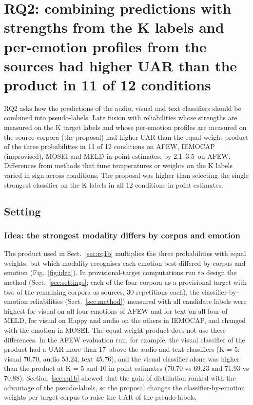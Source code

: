 \section{RQ2: combining predictions with strengths from the K labels and per-emotion profiles from the sources had higher UAR than the product in 11 of 12 conditions}\label{sec:rq2}

RQ2 asks how the predictions of the audio, visual and text classifiers should be combined into pseudo-labels. Late fusion with reliabilities whose strengths are measured on the K target labels and whose per-emotion profiles are measured on the source corpora (the proposal) had higher UAR than the equal-weight product of the three probabilities in 11 of 12 conditions on AFEW, IEMOCAP (improvised), MOSEI and MELD in point estimates, by 2.1--3.5\pt\ on AFEW. Differences from methods that tune temperatures or weights on the K labels varied in sign across conditions. The proposal was higher than selecting the single strongest classifier on the K labels in all 12 conditions in point estimates.

\subsection{Setting}

\subsubsection{Idea: the strongest modality differs by corpus and emotion}\label{sec:idea}
The product used in Sect.~\ref{sec:rq1b} multiplies the three probabilities with equal weights, but which modality recognises each emotion best differed by corpus and emotion (Fig.~\ref{fig:idea}). In provisional-target computations run to design the method (Sect.~\ref{sec:settings}; each of the four corpora as a provisional target with two of the remaining corpora as sources, 30 repetitions each), the classifier-by-emotion reliabilities (Sect.~\ref{sec:method}) measured with all candidate labels were highest for visual on all four emotions of AFEW and for text on all four of MELD, for visual on Happy and audio on the others in IEMOCAP, and changed with the emotion in MOSEI. The equal-weight product does not use these differences. In the AFEW evaluation run, for example, the visual classifier of the product had a UAR more than 17\pt\ above the audio and text classifiers (K = 5: visual 70.70, audio 53.24, text 45.76), and the visual classifier alone was higher than the product at K = 5 and 10 in point estimates (70.70 vs 69.23 and 71.93 vs 70.88). Section~\ref{sec:rq1b} showed that the gain of distillation ranked with the advantage of the pseudo-labels, so the proposal changes the classifier-by-emotion weights per target corpus to raise the UAR of the pseudo-labels.

